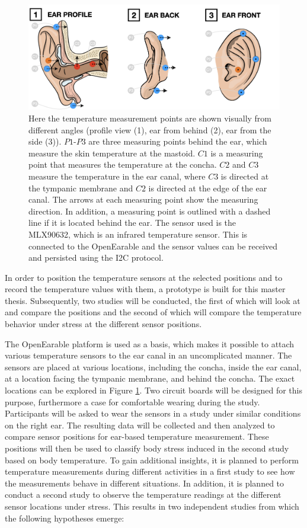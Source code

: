 \begin{figure}[t]
    \centering
    \includegraphics[scale=0.26]{thesis-doc/images/ear_measurement_points/emp.png}
    \caption{Here the temperature measurement points are shown visually from different angles (profile view (1), ear from behind (2), ear from the side (3)). $P1$-$P3$ are three measuring points behind the ear, which measure the skin temperature at the mastoid. $C1$ is a measuring point that measures the temperature at the concha. $C2$ and $C3$ measure the temperature in the ear canal, where $C3$ is directed at the tympanic membrane and $C2$ is directed at the edge of the ear canal. The arrows at each measuring point show the measuring direction. In addition, a measuring point is outlined with a dashed line if it is located behind the ear. The sensor used is the MLX90632, which is an infrared temperature sensor. This is connected to the OpenEarable and the sensor values can be received and persisted using the I2C protocol.}
    \label{fig:ear_measurement_positions}
\end{figure}

In order to position the temperature sensors at the selected positions and to record the temperature values with them, a prototype is built for this master thesis.
Subsequently, two studies will be conducted, the first of which will look at and compare the positions and the second of which will compare the temperature behavior under stress at the different sensor positions.

The OpenEarable platform is used as a basis, which makes it possible to attach various temperature sensors to the ear canal in an uncomplicated manner. 
The sensors are placed at various locations, including the concha, inside the ear canal, at a location facing the tympanic membrane, and behind the concha.
The exact locations can be explored in Figure \ref{fig:ear_measurement_positions}.
Two circuit boards will be designed for this purpose, furthermore a case for comfortable wearing during the study.
Participants will be asked to wear the sensors in a study under similar conditions on the right ear.
The resulting data will be collected and then analyzed to compare sensor positions for ear-based temperature measurement. 
These positions will then be used to classify body stress induced in the second study based on body temperature.
To gain additional insights, it is planned to perform temperature measurements during different activities in a first study to see how the measurements behave in different situations. 
In addition, it is planned to conduct a second study to observe the temperature readings at the different sensor locations under stress.
This results in two independent studies from which the following hypotheses emerge:

